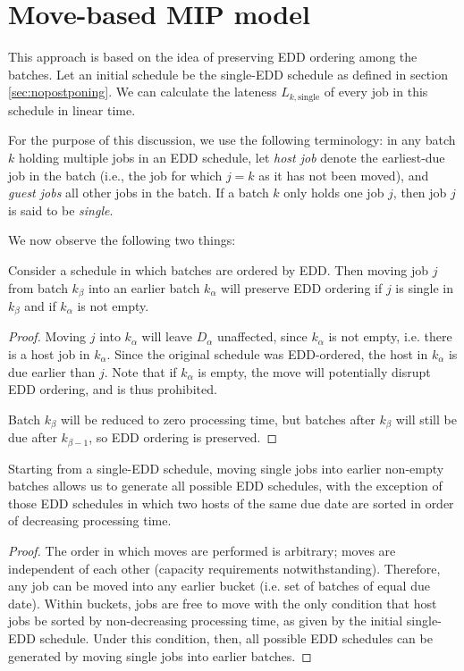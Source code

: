 \documentclass[13pt, letterpaper, oneside]{book}
\begin{document}
\section{Move-based MIP model}
\label{sec:movebackmip}
This approach is based on the idea of preserving EDD ordering among the batches.
Let an initial schedule be the single-EDD schedule as defined in section
\ref{sec:nopostponing}. We can calculate the lateness
$L_{k,\text{single}}$ of every job in this schedule in linear time.

For the purpose of this discussion, we use the following terminology: in any
batch $k$ holding multiple jobs in an EDD schedule, let \textit{host job} denote
the earliest-due job in the batch (i.e., the job for which $j = k$ as it has
not been moved), and \textit{guest jobs} all other jobs in the batch. If a
batch $k$ only holds one job $j$, then job $j$ is said to be \textit{single}.
 
We now observe the following two things:
 
\begin{proposition}
Consider a schedule in which batches are ordered by EDD. Then moving job $j$
from batch $k_\beta$ into an earlier batch $k_\alpha$ will preserve EDD ordering
if $j$ is single in $k_\beta$ and if $k_\alpha$ is not empty.
\end{proposition}
\begin{proof}
Moving $j$ into $k_\alpha$ will leave $D_\alpha$ unaffected, since $k_\alpha$ is
not empty, i.e. there is a host job in $k_\alpha$. Since the original schedule
was EDD-ordered, the host in $k_\alpha$ is due earlier than $j$. Note that if
$k_\alpha$ is empty, the move will potentially disrupt EDD ordering, and is thus
prohibited.
 
Batch $k_\beta$ will be reduced to zero processing time, but batches after
$k_\beta$ will still be due after $k_{\beta - 1}$, so EDD ordering is preserved.
\end{proof}
 
\begin{proposition}
Starting from a single-EDD schedule, moving single jobs into earlier
non-empty batches allows us to generate all possible EDD schedules, with the exception
of those EDD schedules in which two hosts of the same due date are sorted in
order of decreasing processing time.
\end{proposition}
\begin{proof}
The order in which moves are performed is arbitrary; moves are independent of
each other (capacity requirements notwithstanding). Therefore, any job can be
moved into any earlier bucket (i.e. set of batches of equal due date). Within
buckets, jobs are free to move with the only condition that host jobs be sorted
by non-decreasing processing time, as given by the initial single-EDD schedule.
Under this condition, then, all possible EDD schedules can be generated by
moving single jobs into earlier batches. \end{proof}
\end{document}
